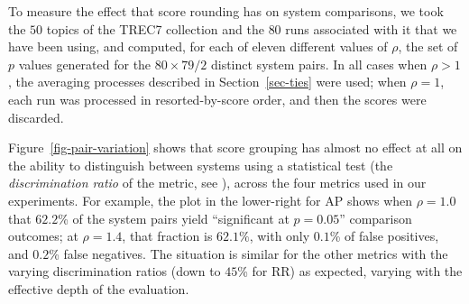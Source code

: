 To measure the effect that score rounding has on system comparisons,
we took the $50$ topics of the TREC7 collection and the $80$ runs
associated with it that we have been using, and computed, for each of
eleven different values of $\rho$, the set of $p$ values generated
for the $80\times79/2$ distinct system pairs.
In all cases when $\rho>1$, the averaging processes described in
Section~\ref{sec-ties} were used; when $\rho=1$, each run was
processed in resorted-by-score order, and then the scores were
discarded.

Figure~\ref{fig-pair-variation} shows that score grouping has almost
no effect at all on the ability to distinguish between systems using
a statistical test (the {\emph{discrimination ratio}} of the metric,
see {\citet{sakai07sigir}}), across the four metrics used in our
experiments.
For example, the plot in the lower-right for AP shows when $\rho=1.0$
that $62.2$\% of the system pairs yield ``significant at $p=0.05$''
comparison outcomes; at $\rho=1.4$, that fraction is $62.1\%$, with
only $0.1$\% of false positives, and $0.2$\% false negatives.
The situation is similar for the other metrics with the varying
discrimination ratios (down to $45$\% for RR) as expected, varying
with the effective depth of the evaluation.
